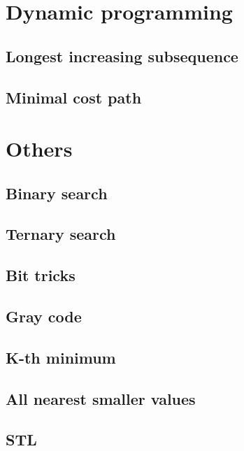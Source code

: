 \documentclass[a4paper]{article}
\begin{document}
\begin{multicols*}{2}
\section{Dynamic programming}
    \subsection{Longest increasing subsequence}
        
    \subsection{Minimal cost path}
        

\section{Others}
    \subsection{Binary search}
        
    \subsection{Ternary search}
        
    \subsection{Bit tricks}
        
    \subsection{Gray code}
        
    \subsection{K-th minimum}
        
    \subsection{All nearest smaller values}
        
    \subsection{STL}
        

\end{multicols*}
\end{document}
